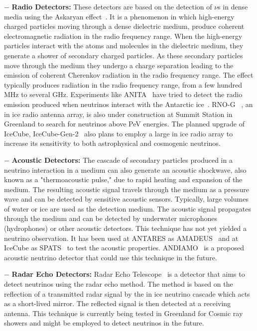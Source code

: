 \begin{description}
  \item $-$ \textbf{Radio Detectors:} These detectors are based on the detection of $\nu$s in dense media using the Askaryan effect~\cite{Askaryan:1961pfb,PhysRevD.84.103003}. It is a phenomenon in which high-energy charged particles moving through a dense dielectric medium, produce coherent electromagnetic radiation in the radio frequency range.  When the high-energy particles interact with the atoms and molecules in the dielectric medium, they generate a shower of secondary charged particles. As these secondary particles move through the medium they undergo a charge separation leading to the emission of coherent Cherenkov radiation in the radio frequency range. The effect typically produces radiation in the radio frequency range, from a few hundred \gls{MHz} to several \gls{GHz}. Experiments like ANITA~\cite{ANITA:2008mzi} have tried to detect the radio emission produced when neutrinos interact with the Antarctic ice~\cite{Schoorlemmer_2016}. RNO-G ~\cite{Aguilar_2021}, an in ice radio antenna array, is also under construction at Summit Station in Greenland to search for neutrinos above PeV energies. The planned upgrade of IceCube, IceCube-Gen-2~\cite{Aartsen_2021_Gen-2} also plans to employ a large in ice radio array to increase its sensitivity to both astrophysical and cosmogenic neutrinos. 
  
  \item $-$ \textbf{Acoustic Detectors:}  The cascade of secondary particles produced in a neutrino interaction in a medium can also generate an acoustic shockwave, also known as a "thermoacoustic pulse," due to rapid heating and expansion of the medium. The resulting acoustic signal travels through the medium as a pressure wave and can be detected by sensitive acoustic sensors. Typically, large volumes of water or ice are used as the detection medium. The acoustic signal propagates through the medium and can be detected by underwater microphones (hydrophones) or other acoustic detectors. This technique has not yet yielded a neutrino observation. It has been used at ANTARES as AMADEUS~\cite{LAHMANN2012S216} and at IceCube as SPATS~\cite{Karg_2012} to test the acoustic properties. ANDIAMO~\cite{Marinelli_2022} is a proposed acoustic neutrino detector that could use this technique in the future.
  
  \item $-$ \textbf{Radar Echo Detectors:} Radar Echo Telescope~\cite{Prohira_2021} is a detector that aims to detect neutrinos using the radar echo method. The method is based on the reflection of a transmitted radar signal by the in ice neutrino cascade which acts as a short-lived mirror. The reflected signal is then detected at a receiving antenna. This technique is currently being tested in Greenland for Cosmic ray showers and might be employed to detect neutrinos in the future.


\end{description}
